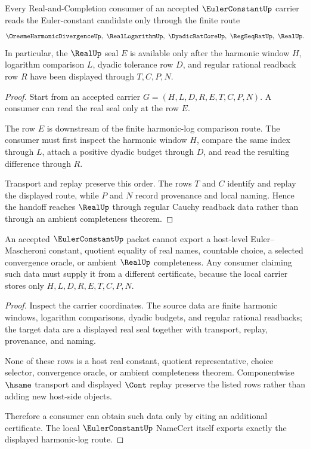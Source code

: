 \begin{theorem}
\label{thm:euler-constant-regular-cauchy-handoff}
Every Real-and-Completion consumer of an accepted $\EulerConstantUp$ carrier reads the Euler-constant candidate only through the finite route
$$
\OresmeHarmonicDivergenceUp,\ \RealLogarithmUp,\ \DyadicRatCoreUp,\ \RegSeqRatUp,\ \RealUp .
$$
In particular, the $\RealUp$ seal $E$ is available only after the harmonic window $H$, logarithm comparison $L$, dyadic tolerance row $D$, and regular rational readback row $R$ have been displayed through $T,C,P,N$.
\end{theorem}
\begin{proof}
Start from an accepted carrier $G=(H,L,D,R,E,T,C,P,N)$. A consumer can read the real seal only at the row $E$.

The row $E$ is downstream of the finite harmonic-log comparison route. The consumer must first inspect the harmonic window $H$, compare the same index through $L$, attach a positive dyadic budget through $D$, and read the resulting difference through $R$.

Transport and replay preserve this order. The rows $T$ and $C$ identify and replay the displayed route, while $P$ and $N$ record provenance and local naming. Hence the handoff reaches $\RealUp$ through regular Cauchy readback data rather than through an ambient completeness theorem.
\end{proof}

\begin{theorem}
\label{thm:euler-constant-nonescape}
An accepted $\EulerConstantUp$ packet cannot export a host-level Euler--Mascheroni constant, quotient equality of real names, countable choice, a selected convergence oracle, or ambient $\RealUp$ completeness. Any consumer claiming such data must supply it from a different certificate, because the local carrier stores only $H,L,D,R,E,T,C,P,N$.
\end{theorem}
\begin{proof}
Inspect the carrier coordinates. The source data are finite harmonic windows, logarithm comparisons, dyadic budgets, and regular rational readbacks; the target data are a displayed real seal together with transport, replay, provenance, and naming.

None of these rows is a host real constant, quotient representative, choice selector, convergence oracle, or ambient completeness theorem. Componentwise $\hsame$ transport and displayed $\Cont$ replay preserve the listed rows rather than adding new host-side objects.

Therefore a consumer can obtain such data only by citing an additional certificate. The local $\EulerConstantUp$ NameCert itself exports exactly the displayed harmonic-log route.
\end{proof}

